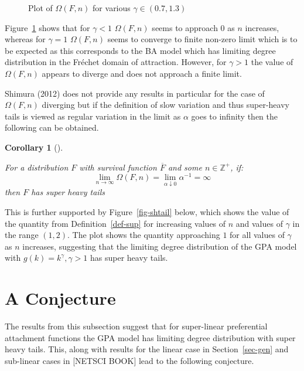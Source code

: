 \documentclass[
  10pt,
  a4paper,
]{scrreprt}
\theoremstyle{plain}
\theoremstyle{plain}
\newtheorem{corollary}{Corollary}[section]
\theoremstyle{plain}
\theoremstyle{definition}
\theoremstyle{remark}
\begin{document}
{\begin{figure}[H]
{}

\caption{\label{fig-omega}Plot of \(\Omega(F,n)\) for various
\(\gamma \in (0.7,1.3)\)}

\end{figure}

Figure~\ref{fig-omega} shows that for \(\gamma<1\) \(\Omega(F,n)\) seems
to approach 0 as \(n\) increases, whereas for \(\gamma=1\)
\(\Omega(F,n)\) seems to converge to finite non-zero limit which is to
be expected as this corresponds to the BA model which has limiting
degree distribution in the Fréchet domain of attraction. However, for
\(\gamma>1\) the value of \(\Omega(F,n)\) appears to diverge and does
not approach a finite limit.

Shimura (2012) does not provide any results in particular for the case
of \(\Omega(F,n)\) diverging but if the definition of slow variation and
thus super-heavy tails is viewed as regular variation in the limit as
\(\alpha\) goes to infinity then the following can be obtained.

\begin{corollary}[]\protect\hypertarget{cor-omg}{}\label{cor-omg}

For a distribution \(F\) with survival function \(\overline F\) and some
\(n\in\mathbb Z^+\), if: \[
\lim_{n\rightarrow\infty} \Omega(F,n) = \lim_{\alpha\downarrow0} \alpha^{-1} = \infty
\] then \(F\) has super heavy tails

\end{corollary}

This is further supported by Figure~\ref{fig-shtail} below, which shows
the value of the quantity from Definition~\ref{def-sup} for increasing
values of \(n\) and values of \(\gamma\) in the range \((1,2)\). The
plot shows the quantity approaching \(1\) for all values of \(\gamma\)
as \(n\) increases, suggesting that the limiting degree distribution of
the GPA model with \(g(k) = k^\gamma,\gamma>1\) has super heavy tails.

\hypertarget{a-conjecture}{%
\section{A Conjecture}\label{a-conjecture}}

The results from this subsection suggest that for super-linear
preferential attachment functions the GPA model has limiting degree
distribution with super heavy tails. This, along with results for the
linear case in Section~\ref{sec-gen} and sub-linear cases in {[}NETSCI
BOOK{]} lead to the following conjecture.

}
\end{document}
